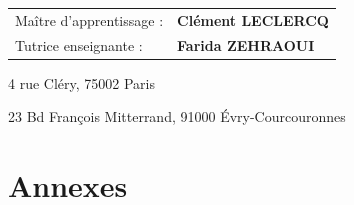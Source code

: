 \documentclass{article}
\begin{document}
\begin{titlepage}
  \vspace{1.2cm}

  \centering
  \begin{tabular}{@{}l l@{}}
    \large Maître d’apprentissage : & \large \textbf{Clément LECLERCQ} \\
    \large Tutrice enseignante :    & \large \textbf{Farida ZEHRAOUI} \\
  \end{tabular}

  \vfill

  {\small
    4 rue Cléry, 75002 Paris \par
    23 Bd François Mitterrand, 91000 Évry-Courcouronnes
  }
\end{titlepage}

\tableofcontents %

\newpage

\newpage

\newpage

\newpage

\newpage

\newpage
 
\newpage
\printbibliography
{}


\newpage
\appendix
\section*{Annexes}
\end{document}
